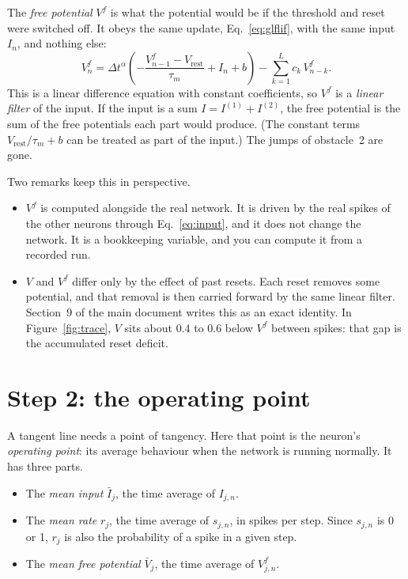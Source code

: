 \documentclass[11pt,a4paper]{article}
\newcommand{\Vrest}{V_{\mathrm{rest}}}
\begin{document}
The \emph{free potential} $V^f$ is what the potential would be if the threshold and reset were switched off. It obeys the same update, Eq.~\eqref{eq:glflif}, with the same input $I_n$, and nothing else:
\begin{equation}
V^f_n = \Delta t^{\alpha}\left( -\frac{V^f_{n-1} - \Vrest}{\tau_m} + I_n + b \right) - \sum_{k=1}^{L} c_k\, V^f_{n-k}.
\label{eq:vfree}
\end{equation}
This is a linear difference equation with constant coefficients, so $V^f$ is a \emph{linear filter} of the input. If the input is a sum $I = I^{(1)} + I^{(2)}$, the free potential is the sum of the free potentials each part would produce. (The constant terms $\Vrest/\tau_m + b$ can be treated as part of the input.) The jumps of obstacle~2 are gone.

Two remarks keep this in perspective.
\begin{itemize}
  \item $V^f$ is computed alongside the real network. It is driven by the real spikes of the other neurons through Eq.~\eqref{eq:input}, and it does not change the network. It is a bookkeeping variable, and you can compute it from a recorded run.
  \item $V$ and $V^f$ differ only by the effect of past resets. Each reset removes some potential, and that removal is then carried forward by the same linear filter. Section~9 of the main document writes this as an exact identity. In Figure~\ref{fig:trace}, $V$ sits about 0.4 to 0.6 below $V^f$ between spikes: that gap is the accumulated reset deficit.
\end{itemize}

\section{Step 2: the operating point}
\label{sec:operating}

A tangent line needs a point of tangency. Here that point is the neuron's \emph{operating point}: its average behaviour when the network is running normally. It has three parts.

\begin{itemize}
  \item The \emph{mean input} $\bar I_j$, the time average of $I_{j,n}$.
  \item The \emph{mean rate} $r_j$, the time average of $s_{j,n}$, in spikes per step. Since $s_{j,n}$ is 0 or 1, $r_j$ is also the probability of a spike in a given step.
  \item The \emph{mean free potential} $\bar V_j$, the time average of $V^f_{j,n}$.
\end{itemize}
\end{document}
